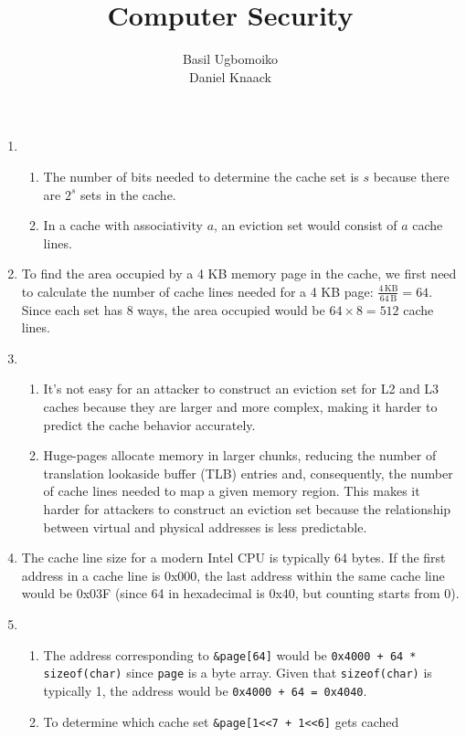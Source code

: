 \documentclass[sheet=2, prefix, english]{dexercise}
\title{Computer Security}
\author{Basil Ugbomoiko\\Daniel Knaack}
\begin{document}
\task[Caches]

\begin{enumerate}
  \item
    \begin{enumerate}
      \item
        The number of bits needed to determine the cache set is $s$ because
        there are $2^s$ sets in the cache.
      \item
        In a cache with associativity $a$, an eviction set would consist of $a$
        cache lines.
    \end{enumerate}
  \item
    To find the area occupied by a 4 KB memory page in the cache, we first need
    to calculate the number of cache lines needed for a 4 KB page: $\frac{4\,
    \text{KB}}{64\, \text{B}} = 64$.
    Since each set has 8 ways, the area occupied would be $64 \times 8 = 512$
    cache lines.
  \item
    \begin{enumerate}
      \item
        It's not easy for an attacker to construct an eviction set for L2 and
        L3 caches because they are larger and more complex, making it harder to
        predict the cache behavior accurately.
      \item
        Huge-pages allocate memory in larger chunks, reducing the number of
        translation lookaside buffer (TLB) entries and, consequently, the
        number of cache lines needed to map a given memory region.
        This makes it harder for attackers to construct an eviction set because
        the relationship between virtual and physical addresses is less
        predictable.
    \end{enumerate}
  \item
    The cache line size for a modern Intel CPU is typically 64 bytes.
    If the first address in a cache line is 0x000, the last address within the
    same cache line would be 0x03F (since 64 in hexadecimal is 0x40, but
    counting starts from 0).
  \item
    \begin{enumerate}
      \item
        The address corresponding to \texttt{\&page[64]} would be
        \texttt{0x4000 + 64 * sizeof(char)} since \texttt{page} is a byte
        array. Given that \texttt{sizeof(char)} is typically 1, the address
        would be \texttt{0x4000 + 64 = 0x4040}.
      \item
        To determine which cache set \texttt{\&page[1<<7 + 1<<6]} gets cached

\end{enumerate}
\end{enumerate}
\end{document}
